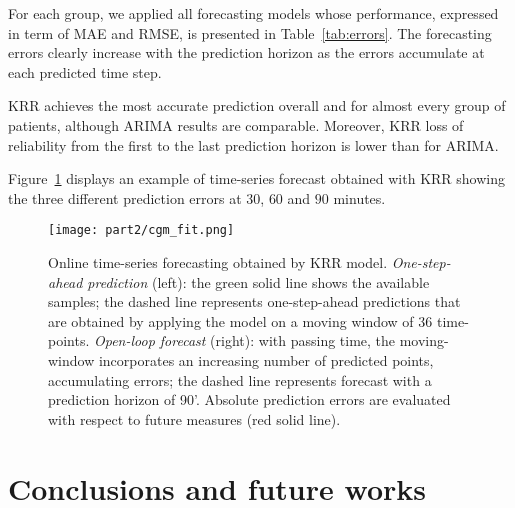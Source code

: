 For each group, we applied all forecasting models whose performance, expressed in term of MAE and RMSE, is presented in Table~\ref{tab:errors}. 
The forecasting errors clearly increase with the prediction horizon as the errors accumulate at each predicted time step.

KRR achieves the most accurate prediction overall and for almost every group of patients, although ARIMA results are comparable. Moreover, KRR loss of reliability from the first to the last prediction horizon is lower than for ARIMA.

Figure~\ref{fig:fit} displays an example of time-series forecast obtained with KRR showing the three different prediction errors at $30$, $60$ and $90$ minutes.


\begin{figure}[tb]
	\caption{Online time-series forecasting obtained by KRR model. \textit{One-step-ahead prediction} (left): the green solid line shows the available samples; the dashed line represents one-step-ahead predictions that are obtained by applying the model on a moving window of 36 time-points. \textit{Open-loop forecast} (right): with passing time, the moving-window incorporates an increasing number of predicted points, accumulating errors; the dashed line represents forecast with a prediction horizon of 90'.
	Absolute prediction errors are evaluated with respect to future measures (red solid line).
	}\label{fig:fit}
	\centering
	\texttt{[image: part2/cgm\_fit.png]}
\end{figure}


\section{Conclusions and future works}

